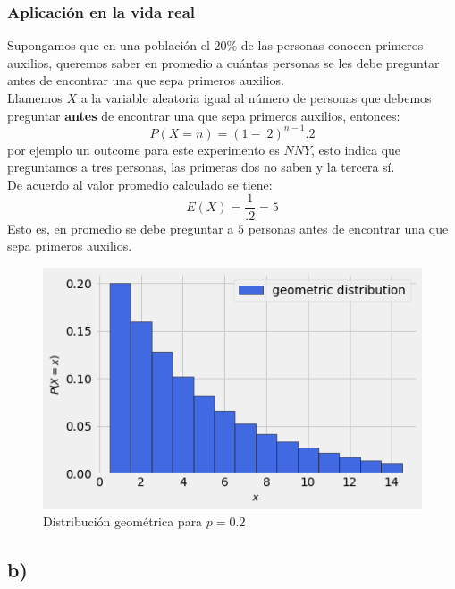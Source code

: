 \documentclass{article}
\begin{document}
\begin{tcolorbox}[breakable]
    \subsubsection*{Aplicación en la vida real}
    Supongamos que en una población el $20\%$ de las personas conocen primeros auxilios,
    queremos saber en promedio a cuántas personas se les debe preguntar 
    antes de encontrar una que sepa primeros auxilios. \\
    Llamemos $X$ a la variable aleatoria igual al número de personas que debemos preguntar
    \textbf{antes} de encontrar una que sepa primeros auxilios, entonces:
    \[ P(X=n) = (1-.2)^{n-1}.2 \]
    por ejemplo un outcome para este experimento es $NNY$, esto indica que preguntamos a tres personas, 
    las primeras dos no saben y la tercera sí. \\
    De acuerdo al valor promedio calculado se tiene:
    \[ E(X) = \frac{1}{.2} = 5\]
    Esto es, en promedio se debe preguntar a $5$ personas antes de encontrar una que sepa primeros auxilios.
    \begin{figure}[H]
        \centering
        \includegraphics[scale=0.7]{images/p7_geometric.png}
        \caption{Distribución geométrica para $p=0.2$}
    \end{figure}
    \subsection*{b)}

\end{tcolorbox}
\end{document}

